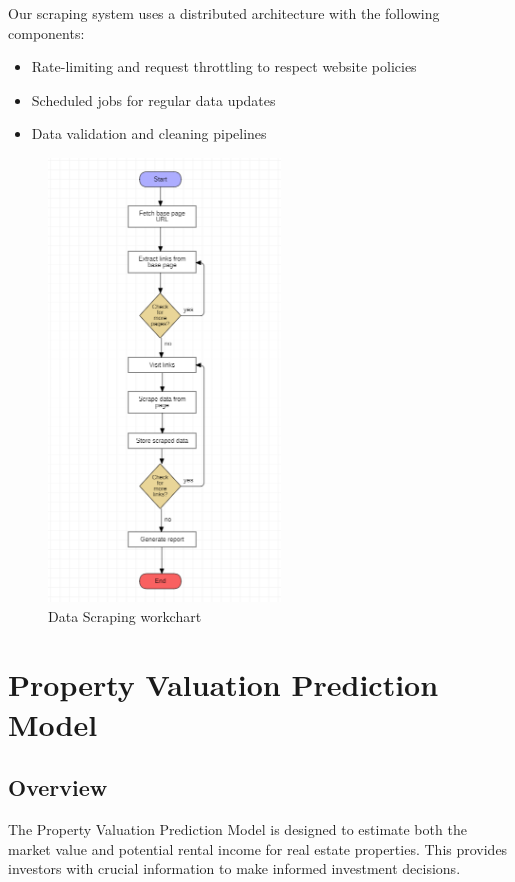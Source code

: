 Our scraping system uses a distributed architecture with the following components:
\begin{itemize}
    \item Rate-limiting and request throttling to respect website policies
    \item Scheduled jobs for regular data updates
    \item Data validation and cleaning pipelines
\end{itemize}
\newpage
\begin{figure}[htbp]
    \centering
    \includegraphics[width=0.55\textwidth]{images/workchartscraper.png}
    \caption{Data Scraping workchart}
    \label{fig:scraping-workchart}
\end{figure}



\section{Property Valuation Prediction Model}
\subsection{Overview}
The Property Valuation Prediction Model is designed to estimate both the market value and potential rental income for real estate properties. This provides investors with crucial information to make informed investment decisions.

